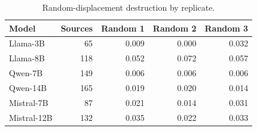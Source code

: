 \begin{table}[H]
\centering
\small
\setlength{\tabcolsep}{2pt}
\caption{Random-displacement destruction by replicate.}
\label{tab:frozen-replicates}
\begin{tabular*}{\linewidth}{@{\extracolsep{\fill}}lrrrr@{}}
\toprule
Model & Sources & Random 1 & Random 2 & Random 3 \\
\midrule
Llama-3B & 65 & 0.009 & 0.000 & 0.032 \\
Llama-8B & 118 & 0.052 & 0.072 & 0.057 \\
Qwen-7B & 149 & 0.006 & 0.006 & 0.006 \\
Qwen-14B & 165 & 0.019 & 0.020 & 0.014 \\
Mistral-7B & 87 & 0.021 & 0.014 & 0.031 \\
Mistral-12B & 132 & 0.035 & 0.022 & 0.033 \\
\bottomrule
\end{tabular*}
\end{table}
